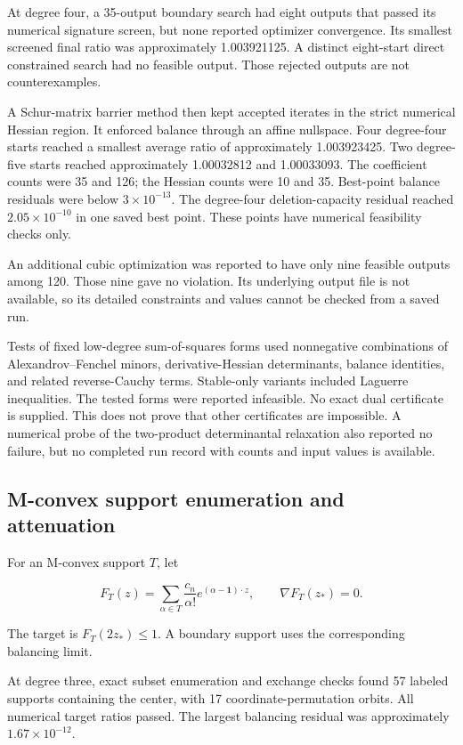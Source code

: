 At degree four, a 35-output boundary search had eight outputs that passed its numerical signature screen, but none reported optimizer convergence. Its smallest screened final ratio was approximately 1.003921125. A distinct eight-start direct constrained search had no feasible output. Those rejected outputs are not counterexamples.

A Schur-matrix barrier method then kept accepted iterates in the strict numerical Hessian region. It enforced balance through an affine nullspace. Four degree-four starts reached a smallest average ratio of approximately 1.003923425. Two degree-five starts reached approximately 1.00032812 and 1.00033093. The coefficient counts were 35 and 126; the Hessian counts were 10 and 35. Best-point balance residuals were below \(3\times10^{-13}\). The degree-four deletion-capacity residual reached \(2.05\times10^{-10}\) in one saved best point. These points have numerical feasibility checks only.

An additional cubic optimization was reported to have only nine feasible outputs among 120. Those nine gave no violation. Its underlying output file is not available, so its detailed constraints and values cannot be checked from a saved run.

Tests of fixed low-degree sum-of-squares forms used nonnegative combinations of Alexandrov--Fenchel minors, derivative-Hessian determinants, balance identities, and related reverse-Cauchy terms. Stable-only variants included Laguerre inequalities. The tested forms were reported infeasible. No exact dual certificate is supplied. This does not prove that other certificates are impossible. A numerical probe of the two-product determinantal relaxation also reported no failure, but no completed run record with counts and input values is available.

\subsection{M-convex support enumeration and attenuation}\label{app:finite-10}

For an M-convex support \(T\), let

\[
F_T(z)=\sum_{\alpha\in T}\frac{c_n}{\alpha!}
 e^{(\alpha-\mathbf1)\cdot z},\qquad \nabla F_T(z_*)=0.
\]

The target is \(F_T(2z_*)\le1\). A boundary support uses the corresponding balancing limit.

At degree three, exact subset enumeration and exchange checks found 57 labeled supports containing the center, with 17 coordinate-permutation orbits. All numerical target ratios passed. The largest balancing residual was approximately \(1.67\times10^{-12}\).

